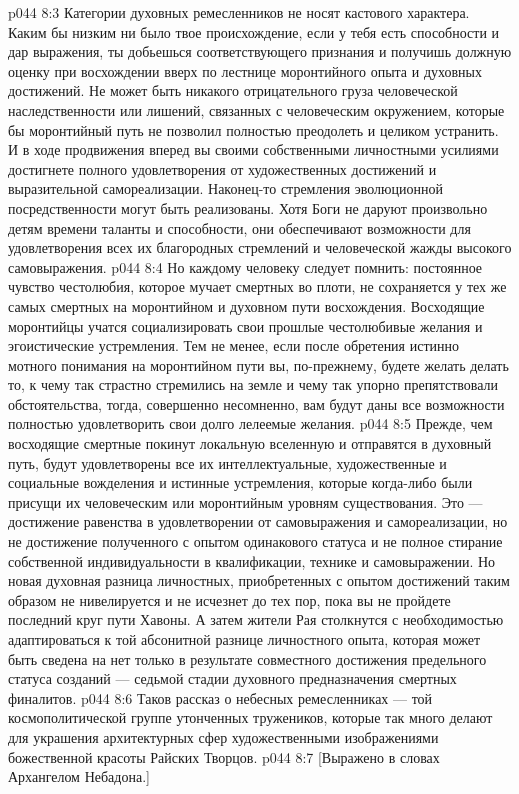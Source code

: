 \vs p044 8:3 \pc Категории духовных ремесленников не носят кастового характера. Каким бы низким ни было твое происхождение, если у тебя есть способности и дар выражения, ты добьешься соответствующего признания и получишь должную оценку при восхождении вверх по лестнице моронтийного опыта и духовных достижений. Не может быть никакого отрицательного груза человеческой наследственности или лишений, связанных с человеческим окружением, которые бы моронтийный путь не позволил полностью преодолеть и целиком устранить. И в ходе продвижения вперед вы своими собственными личностными усилиями достигнете полного удовлетворения от художественных достижений и выразительной самореализации. Наконец\hyp{}то стремления эволюционной посредственности могут быть реализованы. Хотя Боги не даруют произвольно детям времени таланты и способности, они обеспечивают возможности для удовлетворения всех их благородных стремлений и человеческой жажды высокого самовыражения.
\vs p044 8:4 Но каждому человеку следует помнить: постоянное чувство честолюбия, которое мучает смертных во плоти, не сохраняется у тех же самых смертных на моронтийном и духовном пути восхождения. Восходящие моронтийцы учатся социализировать свои прошлые честолюбивые желания и эгоистические устремления. Тем не менее, если после обретения истинно мотного понимания на моронтийном пути вы, по\hyp{}прежнему, будете желать делать то, к чему так страстно стремились на земле и чему так упорно препятствовали обстоятельства, тогда, совершенно несомненно, вам будут даны все возможности полностью удовлетворить свои долго лелеемые желания.
\vs p044 8:5 Прежде, чем восходящие смертные покинут локальную вселенную и отправятся в духовный путь, будут удовлетворены все их интеллектуальные, художественные и социальные вожделения и истинные устремления, которые когда\hyp{}либо были присущи их человеческим или моронтийным уровням существования. Это --- достижение равенства в удовлетворении от самовыражения и самореализации, но не достижение полученного с опытом одинакового статуса и не полное стирание собственной индивидуальности в квалификации, технике и самовыражении. Но новая духовная разница личностных, приобретенных с опытом достижений таким образом не нивелируется и не исчезнет до тех пор, пока вы не пройдете последний круг пути Хавоны. А затем жители Рая столкнутся с необходимостью адаптироваться к той абсонитной разнице личностного опыта, которая может быть сведена на нет только в результате совместного достижения предельного статуса созданий --- седьмой стадии духовного предназначения смертных финалитов.
\vs p044 8:6 \pc Таков рассказ о небесных ремесленниках --- той космополитической группе утонченных тружеников, которые так много делают для украшения архитектурных сфер художественными изображениями божественной красоты Райских Творцов.
\vsetoff
\vs p044 8:7 [Выражено в словах Архангелом Небадона.]
